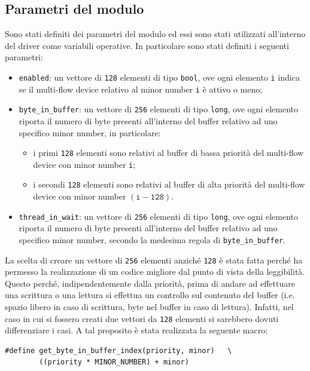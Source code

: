\documentclass[oneside]{article}
\begin{document}
\subsection{Parametri del modulo}
Sono stati definiti dei parametri del modulo ed essi sono stati utilizzati all'interno del driver come variabili operative. In particolare sono stati definiti i seguenti parametri:
\begin{itemize}
\item \texttt{enabled}: un vettore di \texttt{128} elementi di tipo \texttt{bool}, ove ogni elemento \texttt{i} indica se il multi-flow device relativo al minor number \texttt{i} è attivo o meno;
\item \texttt{byte\_in\_buffer}: un vettore di \texttt{256} elementi di tipo \texttt{long}, ove ogni elemento riporta il numero di byte presenti all'interno del buffer relativo ad uno specifico minor number, in particolare:
\begin{itemize}
\item i primi \texttt{128} elementi sono relativi al buffer di bassa priorità del multi-flow device con minor number \texttt{i};
\item i secondi \texttt{128} elementi sono relativi al buffer di alta priorità del multi-flow device con minor number $(\mathtt{i-128})$.
\end{itemize}
\item \texttt{thread\_in\_wait}: un vettore di \texttt{256} elementi di tipo \texttt{long}, ove ogni elemento riporta il numero di byte presenti all'interno del buffer relativo ad uno specifico minor number, secondo la medesima regola di \texttt{byte\_in\_buffer}.
\end{itemize}

La scelta di creare un vettore di \texttt{256} elementi anziché \texttt{128} è stata fatta perché ha permesso la realizzazione di un codice migliore dal punto di vista della leggibilità. Questo perché, indipendentemente dalla priorità, prima di andare ad effettuare una scrittura o una lettura si effettua un controllo sul contenuto del buffer (i.e. spazio libero in caso di scrittura, byte nel buffer in caso di lettura). Infatti, nel caso in cui si fossero creati due vettori da \texttt{128} elementi si sarebbero dovuti differenziare i casi. A tal proposito è stata realizzata la seguente macro:
\begin{lstlisting}
#define get_byte_in_buffer_index(priority, minor)	\
        ((priority * MINOR_NUMBER) + minor)
\end{lstlisting}
\end{document}
